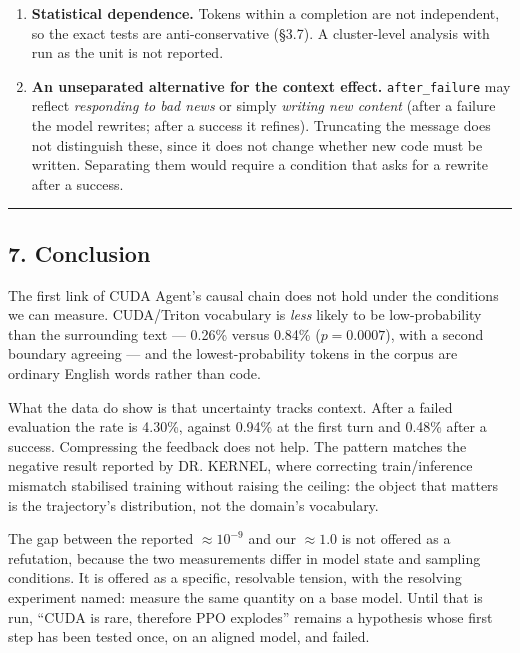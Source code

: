 \documentclass[
  11pt,
]{article}
\begin{document}
\begin{enumerate}
  line, so the \texttt{after\_profiling} context the original plan
  anticipated does not occur.
\item
  \textbf{Statistical dependence.} Tokens within a completion are not
  independent, so the exact tests are anti-conservative (§3.7). A
  cluster-level analysis with run as the unit is not reported.
\item
  \textbf{An unseparated alternative for the context effect.}
  \texttt{after\_failure} may reflect \emph{responding to bad news} or
  simply \emph{writing new content} (after a failure the model rewrites;
  after a success it refines). Truncating the message does not
  distinguish these, since it does not change whether new code must be
  written. Separating them would require a condition that asks for a
  rewrite after a success.
\end{enumerate}

\begin{center}\rule{0.5\linewidth}{0.5pt}\end{center}

\hypertarget{conclusion}{%
\subsection{7. Conclusion}\label{conclusion}}

The first link of CUDA Agent's causal chain does not hold under the
conditions we can measure. CUDA/Triton vocabulary is \emph{less} likely
to be low-probability than the surrounding text --- 0.26\% versus 0.84\%
(\(p = 0.0007\)), with a second boundary agreeing --- and the
lowest-probability tokens in the corpus are ordinary English words
rather than code.

What the data do show is that uncertainty tracks context. After a failed
evaluation the rate is 4.30\%, against 0.94\% at the first turn and
0.48\% after a success. Compressing the feedback does not help. The
pattern matches the negative result reported by DR. KERNEL, where
correcting train/inference mismatch stabilised training without raising
the ceiling: the object that matters is the trajectory's distribution,
not the domain's vocabulary.

The gap between the reported \(\approx 10^{-9}\) and our \(\approx 1.0\)
is not offered as a refutation, because the two measurements differ in
model state and sampling conditions. It is offered as a specific,
resolvable tension, with the resolving experiment named: measure the
same quantity on a base model. Until that is run, ``CUDA is rare,
therefore PPO explodes'' remains a hypothesis whose first step has been
tested once, on an aligned model, and failed.
\end{document}
